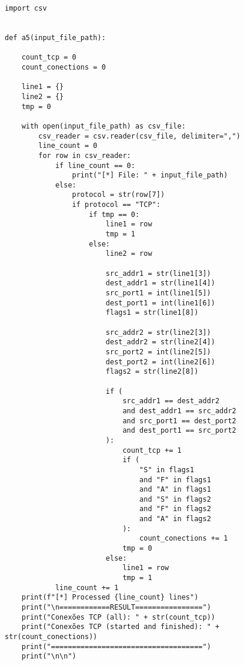\begin{lstlisting}
import csv


def a5(input_file_path):

    count_tcp = 0
    count_conections = 0

    line1 = {}
    line2 = {}
    tmp = 0

    with open(input_file_path) as csv_file:
        csv_reader = csv.reader(csv_file, delimiter=",")
        line_count = 0
        for row in csv_reader:
            if line_count == 0:
                print("[*] File: " + input_file_path)
            else:
                protocol = str(row[7])
                if protocol == "TCP":
                    if tmp == 0:
                        line1 = row
                        tmp = 1
                    else:
                        line2 = row

                        src_addr1 = str(line1[3])
                        dest_addr1 = str(line1[4])
                        src_port1 = int(line1[5])
                        dest_port1 = int(line1[6])
                        flags1 = str(line1[8])

                        src_addr2 = str(line2[3])
                        dest_addr2 = str(line2[4])
                        src_port2 = int(line2[5])
                        dest_port2 = int(line2[6])
                        flags2 = str(line2[8])

                        if (
                            src_addr1 == dest_addr2
                            and dest_addr1 == src_addr2
                            and src_port1 == dest_port2
                            and dest_port1 == src_port2
                        ):
                            count_tcp += 1
                            if (
                                "S" in flags1
                                and "F" in flags1
                                and "A" in flags1
                                and "S" in flags2
                                and "F" in flags2
                                and "A" in flags2
                            ):
                                count_conections += 1
                            tmp = 0
                        else:
                            line1 = row
                            tmp = 1
            line_count += 1
    print(f"[*] Processed {line_count} lines")
    print("\n============RESULT================")
    print("Conexões TCP (all): " + str(count_tcp))
    print("Conexões TCP (started and finished): " + str(count_conections))
    print("====================================")
    print("\n\n")



\end{lstlisting}
